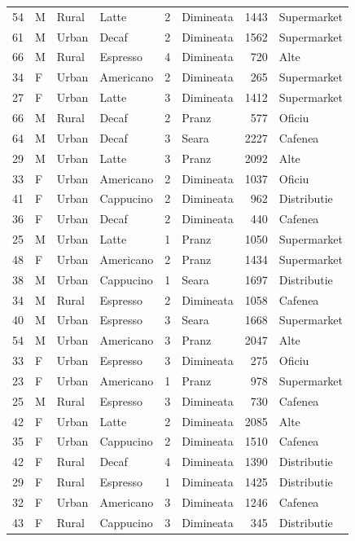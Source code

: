 \documentclass[12pt,a4paper]{report}
\begin{document}
\begin{appendices}
\begin{longtable}{rlllrlrl}
54 & M & Rural & Latte & 2 & Dimineata & 1443 & Supermarket \\
61 & M & Urban & Decaf & 2 & Dimineata & 1562 & Supermarket \\
66 & M & Rural & Espresso & 4 & Dimineata & 720 & Alte \\
34 & F & Urban & Americano & 2 & Dimineata & 265 & Supermarket \\
27 & F & Urban & Latte & 3 & Dimineata & 1412 & Supermarket \\
66 & M & Rural & Decaf & 2 & Pranz & 577 & Oficiu \\
64 & M & Urban & Decaf & 3 & Seara & 2227 & Cafenea \\
29 & M & Urban & Latte & 3 & Pranz & 2092 & Alte \\
33 & F & Urban & Americano & 2 & Dimineata & 1037 & Oficiu \\
41 & F & Urban & Cappucino & 2 & Dimineata & 962 & Distributie \\
36 & F & Urban & Decaf & 2 & Dimineata & 440 & Cafenea \\
25 & M & Urban & Latte & 1 & Pranz & 1050 & Supermarket \\
48 & F & Urban & Americano & 2 & Pranz & 1434 & Supermarket \\
38 & M & Urban & Cappucino & 1 & Seara & 1697 & Distributie \\
34 & M & Rural & Espresso & 2 & Dimineata & 1058 & Cafenea \\
40 & M & Urban & Espresso & 3 & Seara & 1668 & Supermarket \\
54 & M & Urban & Americano & 3 & Pranz & 2047 & Alte \\
33 & F & Urban & Espresso & 3 & Dimineata & 275 & Oficiu \\
23 & F & Urban & Americano & 1 & Pranz & 978 & Supermarket \\
25 & M & Rural & Espresso & 3 & Dimineata & 730 & Cafenea \\
42 & F & Urban & Latte & 2 & Dimineata & 2085 & Alte \\
35 & F & Urban & Cappucino & 2 & Dimineata & 1510 & Cafenea \\
42 & F & Rural & Decaf & 4 & Dimineata & 1390 & Distributie \\
29 & F & Rural & Espresso & 1 & Dimineata & 1425 & Distributie \\
32 & F & Urban & Americano & 3 & Dimineata & 1246 & Cafenea \\
43 & F & Rural & Cappucino & 3 & Dimineata & 345 & Distributie \\

\end{longtable}
\end{appendices}
\end{document}
